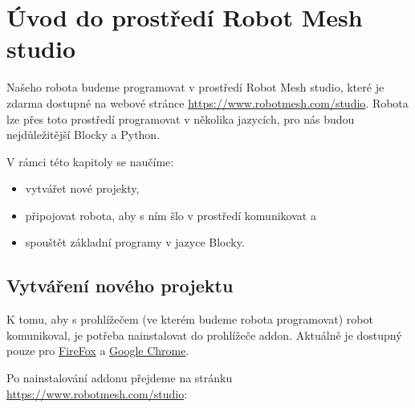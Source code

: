 \documentclass[main.tex]{subfiles}
\begin{document}
	\section{Úvod do prostředí Robot Mesh studio}

	Našeho robota budeme programovat v prostředí Robot Mesh studio, které je zdarma dostupné na webové stránce \href{https://www.robotmesh.com/studio}{https://www.robotmesh.com/studio}. Robota lze přes toto prostředí programovat v několika jazycích, pro nás budou nejdůležitější Blocky a Python.

	V rámci této kapitoly se naučíme:
	\begin{itemize}
		\item vytvářet nové projekty,
		\item připojovat robota, aby s ním šlo v prostředí komunikovat a
		\item spouštět základní programy v jazyce Blocky.
	\end{itemize}

	\subsection{Vytváření nového projektu}
	K tomu, aby s prohlížečem (ve kterém budeme robota programovat) robot komunikoval, je potřeba nainstalovat do prohlížeče addon. Aktuálně je dostupný pouze pro \href{https://addons.mozilla.org/en-US/firefox/addon/robot-mesh-connect/}{FireFox} a \href{https://chrome.google.com/webstore/detail/robot-mesh-connect-app/mapfkcmnklanficcnnjkgeneakedmjkp}{Google Chrome}.

	Po nainstalování addonu přejdeme na stránku \href{https://www.robotmesh.com/studio}{https://www.robotmesh.com/studio}:

	\begin{figure}[h!]
		\centering
	\end{figure}
\end{document}
